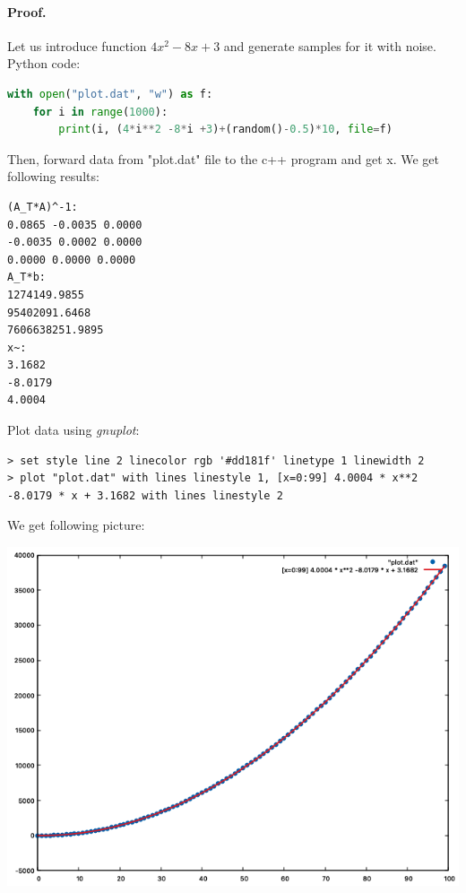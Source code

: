 \documentclass{article}
\begin{document}
\paragraph*{Proof.} Let us introduce function $4x^2-8x+3$ and generate samples for it with noise.
Python code:
\begin{lstlisting}[language=python]
with open("plot.dat", "w") as f:
    for i in range(1000):
        print(i, (4*i**2 -8*i +3)+(random()-0.5)*10, file=f)
\end{lstlisting}
Then, forward data from "plot.dat" file to the c++ program and get x.
We get following results:
\begin{lstlisting}
(A_T*A)^-1:
0.0865 -0.0035 0.0000
-0.0035 0.0002 0.0000
0.0000 0.0000 0.0000
A_T*b:
1274149.9855
95402091.6468
7606638251.9895
x~:
3.1682
-8.0179
4.0004
\end{lstlisting}
Plot data using \textit{gnuplot}:
\begin{lstlisting}
> set style line 2 linecolor rgb '#dd181f' linetype 1 linewidth 2
> plot "plot.dat" with lines linestyle 1, [x=0:99] 4.0004 * x**2 -8.0179 * x + 3.1682 with lines linestyle 2
\end{lstlisting}
We get following picture: \\
\graphicspath{ {./} }
\includegraphics[scale=0.6]{plot.png}
\end{document}
